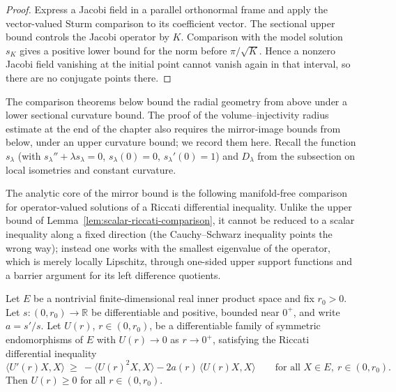 \begin{proof}
\sketch
\leanok
{}
Express a Jacobi field in a parallel orthonormal frame and apply the vector-valued Sturm comparison to its coefficient vector. The sectional upper bound controls the Jacobi operator by $K$. Comparison with the model solution $s_K$ gives a positive lower bound for the norm before $\pi/\sqrt K$. Hence a nonzero Jacobi field vanishing at the initial point cannot vanish again in that interval, so there are no conjugate points there.
\end{proof}

The comparison theorems below bound the radial geometry from above
under a lower sectional curvature bound. The proof of the
volume--injectivity radius estimate at the end of the chapter also
requires the mirror-image bounds from below, under an upper
curvature bound; we record them here. Recall the function
$s_\lambda$ (with $s_\lambda''+\lambda s_\lambda=0$,
$s_\lambda(0)=0$, $s_\lambda'(0)=1$) and $D_\lambda$ from the
subsection on local isometries and constant curvature.

The analytic core of the mirror bound is the following
manifold-free comparison for operator-valued solutions of a Riccati
differential inequality. Unlike the upper bound of
Lemma~\ref{lem:scalar-riccati-comparison}, it cannot be reduced to
a scalar inequality along a fixed direction (the Cauchy--Schwarz
inequality points the wrong way); instead one works with the
smallest eigenvalue of the operator, which is merely locally
Lipschitz, through one-sided upper support functions and a barrier
argument for its left difference quotients.

\begin{lemma}
\label{lem:operator-riccati-lower}
\leanok


Let $E$ be a nontrivial finite-dimensional real inner product space
and fix $r_0>0$. Let $s\colon(0,r_0)\to\mathbb R$ be differentiable
and positive, bounded near $0^+$, and write $a=s'/s$. Let $U(r)$,
$r\in(0,r_0)$, be a differentiable family of symmetric
endomorphisms of $E$ with $U(r)\to0$ as $r\to0^+$, satisfying the
Riccati differential inequality
$$\langle U'(r)X,X\rangle\ \ge\
-\langle U(r)^2X,X\rangle-2a(r)\,\langle U(r)X,X\rangle
\qquad\text{for all }X\in E,\ r\in(0,r_0).$$
Then $U(r)\ge0$ for all $r\in(0,r_0)$.
\end{lemma}

